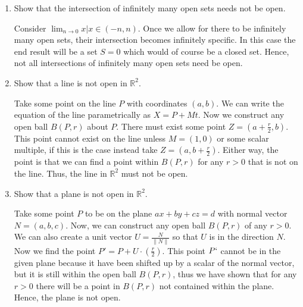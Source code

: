 \documentclass[11pt]{article}
\begin{document}
\begin{enumerate}[label=(\alph*)]
	\item
	
	Show that the intersection of infinitely many open sets needs not be open.
	
	Consider $\lim_{n\to0} {x | x \in (-n,n)}$. Once we allow for there to be infinitely many open sets, their intersection becomes infinitely specific. In this case the end result will be a set $S = {0}$ which would of course be a closed set. Hence, not all intersections of infinitely many open sets need be open.
	
	\item
	
	Show that a line is not open in $\mathbb{R}^2$.
	
	Take some point on the line $P$ with coordinates $(a,b)$. We can write the equation of the line parametrically as $X = P + Mt$. Now we construct any open ball $B(P,r)$ about $P$. There must exist some point $Z = (a + \frac{r}{2}, b)$. This point cannot exist on the line unless $M = (1,0)$ or some scalar multiple, if this is the case instead take $Z = (a, b + \frac{r}{2})$. Either way, the point is that we can find a point within $B(P,r)$ for any $r > 0$ that is not on the line. Thus, the line in $\mathbb{R}^2$ must not be open.
	
	\item
	
	Show that a plane is not open in $\mathbb{R}^2$.
	
	Take some point $P$ to be on the plane $ax + by + cz = d$ with normal vector $N = (a,b,c)$. Now, we can construct any open ball $B(P,r)$ of any $r > 0$. We can also create a unit vector $U = \frac{N}{\| N \|}$ so that $U$ is in the direction $N$. Now we find the point $P' = P + U \cdot (\frac{r}{2})$. This point $P`$ cannot be in the given plane because it have been shifted up by a scalar of the normal vector, but it is still within the open ball $B(P,r)$, thus we have shown that for any $r > 0$ there will be a point in $B(P,r)$ not contained within the plane. Hence, the plane is not open.
	
\end{enumerate}
\end{document}
